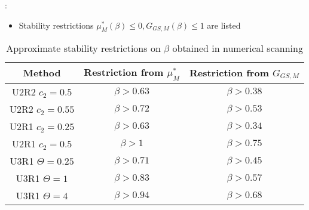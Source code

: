 \documentclass[aspectratio=169,serif]{beamer} %
\begin{document}
\begin{frame}{\secname: \subsecname}
  \small
  \begin{itemize}
    \item Stability restrictions $\mu^*_{M}(\beta) \leq 0,G_{GS,M}(\beta) \leq 1$ are listed
  \end{itemize}
  \footnotesize
  \begin{table}[htbp]
    \centering
    \begin{tabular}{|c|c|c|}
      \hline
      Method             & Restriction from $\mu^*_{M}$ & Restriction from $G_{GS,M}$ \\
      \hline
      U2R2 $c_2=0.5$     & $\beta > 0.63$               & $\beta > 0.38$              \\
      \hline
      U2R2 $c_2=0.55$    & $\beta > 0.72$               & $\beta > 0.53$              \\
      \hline
      U2R1 $c_2=0.25$    & $\beta > 0.63$               & $\beta > 0.34$              \\
      \hline
      U2R1 $c_2=0.5$     & $\beta > 1$                  & $\beta > 0.75$              \\
      \hline
      U3R1 $\Theta=0.25$ & $\beta > 0.71$               & $\beta > 0.45$              \\
      \hline
      U3R1 $\Theta=1$    & $\beta > 0.83$               & $\beta > 0.57$              \\
      \hline
      U3R1 $\Theta=4$    & $\beta > 0.94$               & $\beta > 0.68$              \\
      \hline
    \end{tabular}
    \caption{Approximate stability restrictions on $\beta$ obtained in numerical scanning}
    \label{tab:resrictionBetaSearch}
  \end{table}
\end{frame}
\end{document}

